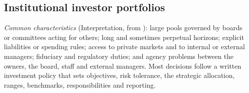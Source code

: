 \subsection{Institutional investor portfolios}

\begin{qfdefinition}\label{def:institutional-investor-characteristics}
 \emph{Common characteristics} (Interpretation, from \citep[chap.~1, pp.~4--28]{s7-ang}): large pools governed by boards or committees acting for others; long and sometimes perpetual horizons; explicit liabilities or spending rules; access to private markets and to internal or external managers; fiduciary and regulatory duties; and agency problems between the owners, the board, staff and external managers. Most decisions follow a written investment policy that sets objectives, risk tolerance, the strategic allocation, ranges, benchmarks, responsibilities and reporting.


\end{qfdefinition}

